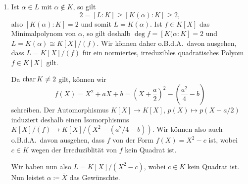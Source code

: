 \begin{solution}
  \begin{enumerate}
    \item
      Ist $\alpha \in L$ mit $\alpha \notin K$, so gilt
      \[
              2
        =     [L : K]
        \geq  [K(\alpha) : K]
        \geq  2,
      \]
      also $[K(\alpha) : K] = 2$ und somit $L = K(\alpha)$.
      Ist $f \in K[X]$ das Minimalpolynom von $\alpha$, so gilt deshalb $\deg f = [K(\alpha : K] = 2$ und $L = K(\alpha) \cong K[X]/(f)$.
      Wir können daher o.B.d.A.\ davon ausgehen, dass $L = K[X]/(f)$ für ein normiertes, irreduzibles quadratisches Polyom $f \in K[X]$ gilt.
      
      Da $\operatorname{char} K \neq 2$ gilt, können wir
      \[
          f(X)
        = X^2 + aX + b
        = \left( X + \frac{a}{2} \right)^2 - \left( \frac{a^2}{4} - b\right)
      \]
      schreiben.
      Der Automorphismus $K[X] \to K[X]$, $p(X) \mapsto p(X - a/2)$ induziert deshalb einen Isomorphismus $K[X]/(f) \to K[X]/(X^2 - (a^2/4 - b))$.
      Wir können also auch o.B.d.A.\ davon ausgehen, dass $f$ von der Form $f(X) = X^2 - c$ ist, wobei $c \in K$ wegen der Irreduziblität von $f$ kein Quadrat ist.
      
      Wir haben nun also $L = K[X]/(X^2 - c)$, wobei $c \in K$ kein Quadrat ist.
      Nun leistet $\alpha \coloneqq \overline{X}$ das Gewünschte.
    

\end{enumerate}
\end{solution}
